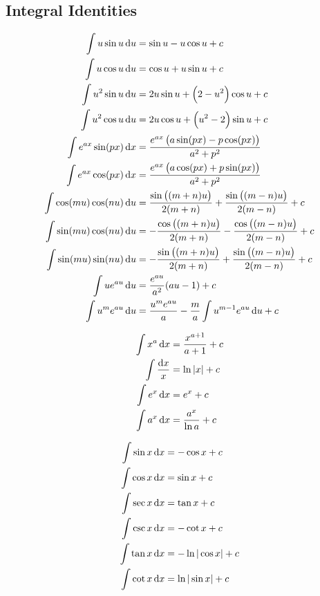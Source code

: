 \documentclass[fleqn, 8pt]{amsart}
\theoremstyle{definition}
\theoremstyle{theorem}
\begin{document}
\begin{multicols}{2}
\begin{spacing}{0.7}
\part{Integral Identities}

\begin{align*}
	\int u \sin u \dif u &= \sin u - u \cos u + c\\
	\int u \cos u \dif u &= \cos u + u \sin u + c\\
	\int u^2 \sin u \dif u &= 2 u \sin u + \left( 2 - u^2 \right) \cos u + c\\
	\int u^2 \cos u \dif u &= 2 u \cos u + \left( u^2 - 2 \right) \sin u + c\\
	\int e^{a x} \sin(p x) \dif x &= \frac{e^{a x} \left( a \sin(p x) - p \cos(p x) \right)}{a^2 + p^2}\\
	\int e^{a x} \cos(p x) \dif x &= \frac{e^{a x} \left( a \cos(p x) + p \sin(p x) \right)}{a^2 + p^2}\\
	\int \cos(m u) \cos(n u) \dif u &= \frac{\sin\left( (m + n) u \right)}{2 (m + n)} + \frac{\sin\left( (m - n) u \right)}{2 (m - n)} + c\\
	\int \sin(m u) \cos(n u) \dif u &= -\frac{\cos\left( (m + n) u \right)}{2 (m + n)} - \frac{\cos\left( (m - n) u \right)}{2 (m - n)} + c\\
	\int \sin(m u) \sin(n u) \dif u &= -\frac{\sin\left( (m + n) u \right)}{2 (m + n)} + \frac{\sin\left( (m - n) u \right)}{2 (m - n)} + c\\
	\int u e^{a u} \dif u &= \frac{e^{a u}}{a^2} (a u - 1) + c\\
	\int u^m e^{a u} \dif u &= \frac{u^m e^{a u}}{a} - \frac{m}{a} \int u^{m - 1} e^{a u} \dif u + c
\end{align*}

\begin{align*}
	\int x^a \dif x &= \frac{x^{a + 1}}{a + 1} + c\\
	\int \frac{\dif x}{x} &= \ln|x| + c\\
	\int e^x \dif x &= e^x + c\\
	\int a^x \dif x &= \frac{a^x}{\ln a} + c
\end{align*}

\begin{align*}
	\int \sin x \dif x &= -\cos x + c\\
	\int \cos x \dif x &= \sin x + c\\
	\int \sec x \dif x &= \tan x + c\\
	\int \csc x \dif x &= -\cot x + c\\
	\int \tan x \dif x &= -\ln|\cos x| + c\\
	\int \cot x \dif x &= \ln|\sin x| + c
\end{align*}


\end{spacing}
\end{multicols}
\end{document}

